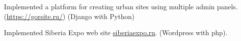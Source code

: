 \begin{cventries}
{\begin{cvitems}
{\begin{flushleft}
        \end{flushleft}
    }
    \item {
        \begin{flushleft}
            Implemented a platform for creating urban sites using multiple admin panels. (\url{https://gorsite.ru/}) (Django with Python)\linebreak
        \end{flushleft}
    }
    \item {
        \begin{flushleft}
            Implemented Siberia Expo web site \url{siberiaexpo.ru}. (Wordpress with php).\linebreak
        \end{flushleft}
    }
\end{cvitems}
}


\end{cventries}
